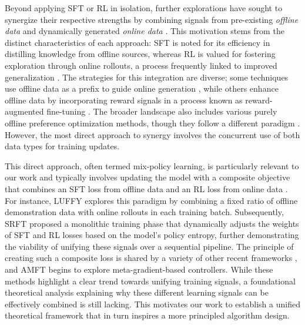 \documentclass{article} %
\newcommand{\0}{\mathbb{0}}
\newcommand{\1}{\mathbb{1}}
\begin{document}
Beyond applying SFT or RL in isolation, further explorations have sought to synergize their respective strengths by combining signals from pre-existing \textit{offline data} and dynamically generated \textit{online data} \citep{fu2025srft, yan2025learning}. This motivation stems from the distinct characteristics of each approach: SFT is noted for its efficiency in distilling knowledge from offline sources, whereas RL is valued for fostering exploration through online rollouts, a process frequently linked to improved generalization \citep{rajani2025scalpel, chu2025sftmemorizesrlgeneralizes}. The strategies for this integration are diverse; some techniques use offline data as a prefix to guide online generation \citep{zhou2023prefix, touvron2024context, li2025self_guided, wang2025beyond}, while others enhance offline data by incorporating reward signals in a process known as reward-augmented fine-tuning \citep{liu2024dft, zhao2023reward, park2025reward_reweighted, sun2025ktae}. The broader landscape also includes various purely offline preference optimization methods, though they follow a different paradigm \citep{rafailov2023dpo, mitchell2024leveraging, liu2025principled, ethayarajh2024kto, ahmadian2024back}. However, the most direct approach to synergy involves the concurrent use of both data types for training updates.


This direct approach, often termed mix-policy learning, is particularly relevant to our work and typically involves updating the model with a composite objective that combines an SFT loss from offline data and an RL loss from online data \citep{dong2023raft, gulcehre2023reinforced, singh2023beyond, liu2023bridging}. For instance, LUFFY \citep{yan2025learning} explores this paradigm by combining a fixed ratio of offline demonstration data with online rollouts in each training batch. Subsequently, SRFT \citep{fu2025srft} proposed a monolithic training phase that dynamically adjusts the weights of SFT and RL losses based on the model's policy entropy, further demonstrating the viability of unifying these signals over a sequential pipeline. The principle of creating such a composite loss is shared by a variety of other recent frameworks \citep{wu2024alternating, zhang2025on, kim2025dynamic, yu2025dapo, 2025empoweringsmallvlmsthink}, and AMFT \citep{2025aligningllm} begins to explore meta-gradient-based controllers. While these methods highlight a clear trend towards unifying training signals, a foundational theoretical analysis explaining why these different learning signals can be effectively combined is still lacking. This motivates our work to establish a unified theoretical framework that in turn inspires a more principled algorithm design.
\end{document}
